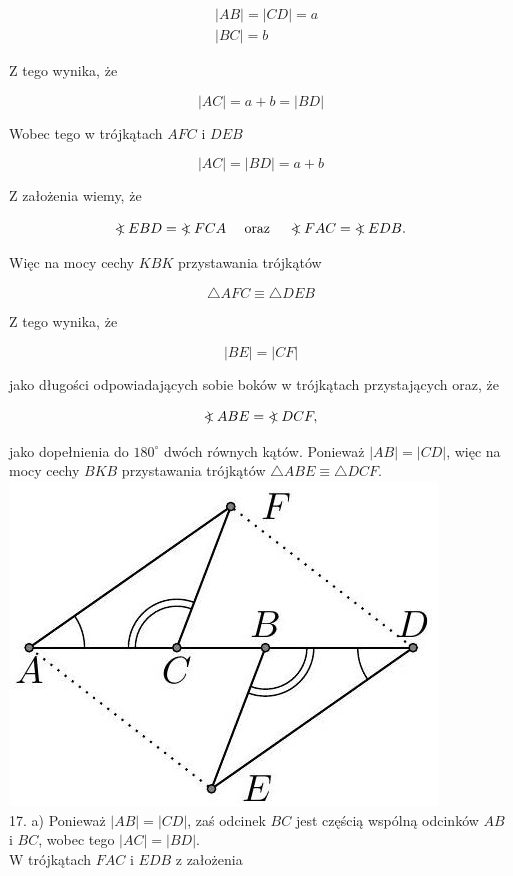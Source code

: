 \documentclass[10pt]{article}
\newcommand\Varangle{\mathop{{<\!\!\!\!\!\text{\small)}}\:}\nolimits}
\begin{document}
\[
\begin{aligned}
& |A B|=|C D|=a \\
& |B C|=b
\end{aligned}
\]

Z tego wynika, że

\[
|A C|=a+b=|B D|
\]

Wobec tego w trójkątach \(A F C\) i \(D E B\)

\[
|A C|=|B D|=a+b
\]

Z założenia wiemy, że

\[
\Varangle E B D=\Varangle F C A \quad \text { oraz } \quad \Varangle F A C=\Varangle E D B .
\]

Więc na mocy cechy \(K B K\) przystawania trójkątów

\[
\triangle A F C \equiv \triangle D E B
\]

Z tego wynika, że

\[
|B E|=|C F|
\]

jako długości odpowiadających sobie boków w trójkątach przystających oraz, że

\[
\Varangle A B E=\Varangle D C F,
\]

jako dopełnienia do \(180^{\circ}\) dwóch równych kątów. Ponieważ \(|A B|=|C D|\), więc na mocy cechy \(B K B\) przystawania trójkątów \(\triangle A B E \equiv \triangle D C F\).\\
\includegraphics[max width=\textwidth, center]{2024_11_21_71f62bd117d375398909g-063}\\
17. a) Ponieważ \(|A B|=|C D|\), zaś odcinek \(B C\) jest częścią wspólną odcinków \(A B\) i \(B C\), wobec tego \(|A C|=|B D|\).\\
W trójkątach \(F A C\) i \(E D B\) z założenia
\end{document}
